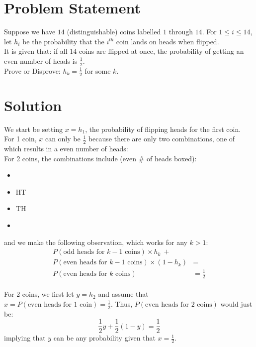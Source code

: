 \documentclass[11pt]{article}
\begin{document}
\section{Problem Statement}
Suppose we have $14$ (distinguishable) coins labelled $1$ through $14$. For $1 \leq i \leq 14$, let $h_i$ be the probability that the $i^{th}$ coin lands on heads when flipped. \\

\noindent It is given that: if all $14$ coins are flipped at once, the probability of getting an even number of heads is $\frac{1}{2}$. \\

\noindent Prove or Disprove: $h_k = \frac{1}{2}$ for some $k$.

\section{Solution}
We start be setting $x = h_1$, the probability of flipping heads for the first coin. \\

\noindent For 1 coin, $x$ can only be $\frac{1}{2}$ because there are only two combinations, one of which results in a even number of heads: \\

\noindent For 2 coins, the combinations include (even \# of heads boxed):
\begin{itemize}
    \item {}
    \item HT
    \item TH
    \item {}
\end{itemize}
and we make the following observation, which works for any $k > 1$:
\begin{align*}
    P(\text{odd heads for $k-1$ coins}) \times h_k~  + \\ P(\text{even heads for $k-1$ coins}) \times (1-h_k) &= \\ P(\text{even heads for $k$ coins}) &= \frac{1}{2}
\end{align*} \\

\noindent For 2 coins, we first let $y = h_2$ and assume that $x = P(\text{even heads for 1 coin}) = \frac{1}{2}$. Thus, $P(\text{even heads for 2 coins})$ would just be:
\begin{equation*}
    \frac{1}{2}y + \frac{1}{2}(1-y) = \frac{1}{2}
\end{equation*}
implying that $y$ can be any probability given that $x = \frac{1}{2}$. \\
\end{document}
